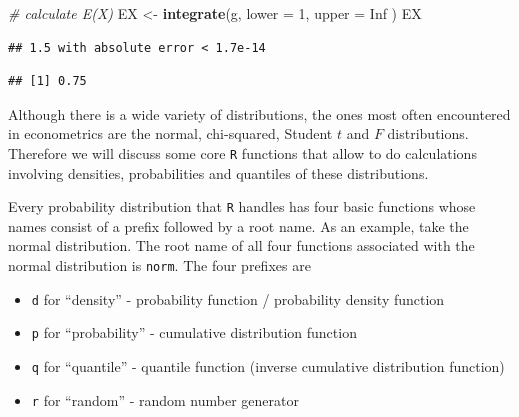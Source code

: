\documentclass[]{book}
\newenvironment{Shaded}{\begin{snugshade}}{\end{snugshade}}
\newcommand{\KeywordTok}[1]{\textcolor[rgb]{0.13,0.29,0.53}{\textbf{#1}}}
\newcommand{\DataTypeTok}[1]{\textcolor[rgb]{0.13,0.29,0.53}{#1}}
\newcommand{\DecValTok}[1]{\textcolor[rgb]{0.00,0.00,0.81}{#1}}
\newcommand{\StringTok}[1]{\textcolor[rgb]{0.31,0.60,0.02}{#1}}
\newcommand{\CommentTok}[1]{\textcolor[rgb]{0.56,0.35,0.01}{\textit{#1}}}
\newcommand{\OtherTok}[1]{\textcolor[rgb]{0.56,0.35,0.01}{#1}}
\newcommand{\OperatorTok}[1]{\textcolor[rgb]{0.81,0.36,0.00}{\textbf{#1}}}
\newcommand{\NormalTok}[1]{#1}
\providecommand{\tightlist}{%
  \setlength{\itemsep}{0pt}\setlength{\parskip}{0pt}}
\theoremstyle{definition}
\theoremstyle{definition}
\theoremstyle{definition}
\theoremstyle{remark}
\begin{document}
\begin{Shaded}
\begin{Highlighting}[]
\CommentTok{# calculate E(X)}
\NormalTok{EX <-}\StringTok{ }\KeywordTok{integrate}\NormalTok{(g,}
                \DataTypeTok{lower =} \DecValTok{1}\NormalTok{,}
                \DataTypeTok{upper =} \OtherTok{Inf}
\NormalTok{                )}
\NormalTok{EX}
\end{Highlighting}
\end{Shaded}

\begin{verbatim}
## 1.5 with absolute error < 1.7e-14
\end{verbatim}

\begin{Shaded}
\end{Shaded}

\begin{verbatim}
## [1] 0.75
\end{verbatim}

Although there is a wide variety of distributions, the ones most often
encountered in econometrics are the normal, chi-squared, Student \(t\)
and \(F\) distributions. Therefore we will discuss some core \texttt{R}
functions that allow to do calculations involving densities,
probabilities and quantiles of these distributions.

Every probability distribution that \texttt{R} handles has four basic
functions whose names consist of a prefix followed by a root name. As an
example, take the normal distribution. The root name of all four
functions associated with the normal distribution is \texttt{norm}. The
four prefixes are

\begin{itemize}
\tightlist
\item
  \texttt{d} for ``density'' - probability function / probability
  density function
\item
  \texttt{p} for ``probability'' - cumulative distribution function
\item
  \texttt{q} for ``quantile'' - quantile function (inverse cumulative
  distribution function)
\item
  \texttt{r} for ``random'' - random number generator
\end{itemize}
\end{document}
